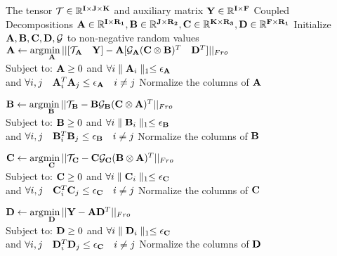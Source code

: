 \begin{algorithm}[ht!]
\footnotesize
\begin{algorithmic}[1] 
  The tensor ${\mathbf{\mathcal{T}}} \in {\mathbb R}^{{\mathbf{I}} \times {\ensuremath{\mathbf{J}}} \times {\ensuremath{\mathbf{K}}}}$ and auxiliary matrix ${\mathbf{Y}} \in {\mathbb R}^{{\mathbf{I}} \times {\ensuremath{\mathbf{F}}}}$
  Coupled Decompositions ${\mathbf{A}} \in {\mathbb R}^{{\mathbf{I}} \times {\ensuremath{\mathbf{R_1}}}}, {\mathbf{B}} \in {\mathbb R}^{{\mathbf{J}} \times {\ensuremath{\mathbf{R_2}}}}, {\mathbf{C}} \in {\mathbb R}^{{\mathbf{K}} \times {\ensuremath{\mathbf{R_3}}}}, {\mathbf{D}} \in {\mathbb R}^{ {\mathbf{F}} \times {\ensuremath{\mathbf{R_1}}}  }$
\State Initialize ${\mathbf{A}}, {\mathbf{B}}, {\mathbf{C}}, {\mathbf{D}}, {\mathbf{\mathcal{G}}}$ to non-negative random values \label{algo_als:init}
 \label{algo_als:p2_start}
\State ${\mathbf{A}} \leftarrow \arg\!\min\limits_{{\mathbf{A}}} || [{\mathbf{\mathcal{T}}}_{{\mathbf{A}}} \quad {\ensuremath{\mathbf{Y}}}] - {\mathbf{A}} [{\mathbf{\mathcal{G}}}_{{\mathbf{A}}}({\mathbf{C}} \otimes {\ensuremath{\mathbf{B}}})^{T} \quad {\ensuremath{\mathbf{D}}}^{T} ] ||_{Fro}$\\ \indent\indent\indent Subject to: ${\mathbf{A}} \geq 0$ and $\forall i \parallel {\ensuremath{\mathbf{A}}}_{i} \parallel_{1} \leq {\ensuremath{\epsilon_{\mathbf{A}}}}$ \\ \indent\indent\indent and $\forall i, j \quad {\ensuremath{\mathbf{A}}}_{i}^{T} {\mathbf{A}}_{j} \leq {\ensuremath{\epsilon_{\mathbf{A}}}} \quad i \neq j$ \label{algo_als:contsraints}
\State Normalize the columns of ${\mathbf{A}}$

\State ${\mathbf{B}} \leftarrow \arg\!\min\limits_{{\mathbf{B}}} ||{\mathbf{\mathcal{T}}}_{{\mathbf{B}}} - {\mathbf{B}} {\mathbf{\mathcal{G}}}_{{\mathbf{B}}} ({\mathbf{C}} \otimes {\ensuremath{\mathbf{A}}})^{T} ||_{Fro}$\\ \indent\indent\indent Subject to: ${\mathbf{B}} \geq 0$ and $\forall i \parallel {\ensuremath{\mathbf{B}}}_{i} \parallel_{1} \leq {\ensuremath{\epsilon_{\mathbf{B}}}}$ \\ \indent\indent\indent and $\forall i, j \quad {\ensuremath{\mathbf{B}}}_{i}^{T} {\mathbf{B}}_{j} \leq {\ensuremath{\epsilon_{\mathbf{B}}}} \quad i \neq j$
\State Normalize the columns of ${\mathbf{B}}$

\State ${\mathbf{C}} \leftarrow \arg\!\min\limits_{{\mathbf{C}}} ||{\mathbf{\mathcal{T}}}_{{\mathbf{C}}} - {\mathbf{C}} {\mathbf{\mathcal{G}}}_{{\mathbf{C}}} ({\mathbf{B}} \otimes {\ensuremath{\mathbf{A}}})^{T} ||_{Fro}$\\ \indent\indent\indent Subject to: ${\mathbf{C}} \geq 0$ and $\forall i \parallel {\ensuremath{\mathbf{C}}}_{i} \parallel_{1} \leq {\ensuremath{\epsilon_{\mathbf{C}}}}$ \\ \indent\indent\indent and $\forall i, j \quad {\ensuremath{\mathbf{C}}}_{i}^{T} {\mathbf{C}}_{j} \leq {\ensuremath{\epsilon_{\mathbf{C}}}} \quad i \neq j$
\State Normalize the columns of ${\mathbf{C}}$


\State ${\mathbf{D}} \leftarrow \arg\!\min\limits_{{\mathbf{D}}} ||{\mathbf{Y}} - {\mathbf{A}} {\mathbf{D}}^{T} ||_{Fro}$\\ \indent\indent\indent Subject to: ${\mathbf{D}} \geq 0$ and $\forall i \parallel {\ensuremath{\mathbf{D}}}_{i} \parallel_{1} \leq {\ensuremath{\epsilon_{\mathbf{C}}}}$ \\ \indent\indent\indent and $\forall i, j \quad {\ensuremath{\mathbf{D}}}_{i}^{T} {\mathbf{D}}_{j} \leq {\ensuremath{\epsilon_{\mathbf{C}}}} \quad i \neq j$
\State Normalize the columns of ${\mathbf{D}}$



\end{algorithmic}
\end{algorithm}
